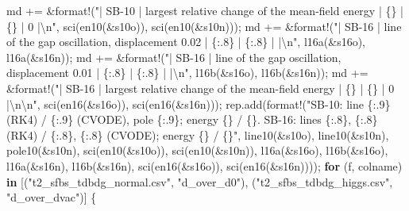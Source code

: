 \documentclass[
  10pt,
]{article}
\newenvironment{Shaded}{}{}
\newcommand{\ControlFlowTok}[1]{\textcolor[rgb]{0.00,0.44,0.13}{\textbf{#1}}}
\newcommand{\KeywordTok}[1]{\textcolor[rgb]{0.00,0.44,0.13}{\textbf{#1}}}
\newcommand{\NormalTok}[1]{#1}
\newcommand{\OperatorTok}[1]{\textcolor[rgb]{0.40,0.40,0.40}{#1}}
\newcommand{\PreprocessorTok}[1]{\textcolor[rgb]{0.74,0.48,0.00}{#1}}
\newcommand{\SpecialCharTok}[1]{\textcolor[rgb]{0.25,0.44,0.63}{#1}}
\newcommand{\StringTok}[1]{\textcolor[rgb]{0.25,0.44,0.63}{#1}}
\begin{document}
\begin{Shaded}
\begin{Highlighting}[]
\NormalTok{    md }\OperatorTok{+=} \OperatorTok{\&}\PreprocessorTok{format!}\NormalTok{(}\StringTok{"| SB{-}10 | largest relative change of the mean{-}field energy | \{\} | \{\} | 0 |}\SpecialCharTok{\textbackslash{}n}\StringTok{"}\OperatorTok{,}\NormalTok{ sci(en10(}\OperatorTok{\&}\NormalTok{s10o))}\OperatorTok{,}\NormalTok{ sci(en10(}\OperatorTok{\&}\NormalTok{s10n)))}\OperatorTok{;}
\NormalTok{    md }\OperatorTok{+=} \OperatorTok{\&}\PreprocessorTok{format!}\NormalTok{(}\StringTok{"| SB{-}16 | line of the gap oscillation, displacement 0.02 | \{:.8\} | \{:.8\} | |}\SpecialCharTok{\textbackslash{}n}\StringTok{"}\OperatorTok{,}\NormalTok{ l16a(}\OperatorTok{\&}\NormalTok{s16o)}\OperatorTok{,}\NormalTok{ l16a(}\OperatorTok{\&}\NormalTok{s16n))}\OperatorTok{;}
\NormalTok{    md }\OperatorTok{+=} \OperatorTok{\&}\PreprocessorTok{format!}\NormalTok{(}\StringTok{"| SB{-}16 | line of the gap oscillation, displacement 0.01 | \{:.8\} | \{:.8\} | |}\SpecialCharTok{\textbackslash{}n}\StringTok{"}\OperatorTok{,}\NormalTok{ l16b(}\OperatorTok{\&}\NormalTok{s16o)}\OperatorTok{,}\NormalTok{ l16b(}\OperatorTok{\&}\NormalTok{s16n))}\OperatorTok{;}
\NormalTok{    md }\OperatorTok{+=} \OperatorTok{\&}\PreprocessorTok{format!}\NormalTok{(}\StringTok{"| SB{-}16 | largest relative change of the mean{-}field energy | \{\} | \{\} | 0 |}\SpecialCharTok{\textbackslash{}n\textbackslash{}n}\StringTok{"}\OperatorTok{,}\NormalTok{ sci(en16(}\OperatorTok{\&}\NormalTok{s16o))}\OperatorTok{,}\NormalTok{ sci(en16(}\OperatorTok{\&}\NormalTok{s16n)))}\OperatorTok{;}
\NormalTok{    rep}\OperatorTok{.}\NormalTok{add(}\PreprocessorTok{format!}\NormalTok{(}\StringTok{"SB{-}10: line \{:.9\} (RK4) / \{:.9\} (CVODE), pole \{:.9\}; energy \{\} / \{\}. SB{-}16: lines \{:.8\}, \{:.8\} (RK4) / \{:.8\}, \{:.8\} (CVODE); energy \{\} / \{\}"}\OperatorTok{,}\NormalTok{ line10(}\OperatorTok{\&}\NormalTok{s10o)}\OperatorTok{,}\NormalTok{ line10(}\OperatorTok{\&}\NormalTok{s10n)}\OperatorTok{,}\NormalTok{ pole10(}\OperatorTok{\&}\NormalTok{s10n)}\OperatorTok{,}\NormalTok{ sci(en10(}\OperatorTok{\&}\NormalTok{s10o))}\OperatorTok{,}\NormalTok{ sci(en10(}\OperatorTok{\&}\NormalTok{s10n))}\OperatorTok{,}\NormalTok{ l16a(}\OperatorTok{\&}\NormalTok{s16o)}\OperatorTok{,}\NormalTok{ l16b(}\OperatorTok{\&}\NormalTok{s16o)}\OperatorTok{,}\NormalTok{ l16a(}\OperatorTok{\&}\NormalTok{s16n)}\OperatorTok{,}\NormalTok{ l16b(}\OperatorTok{\&}\NormalTok{s16n)}\OperatorTok{,}\NormalTok{ sci(en16(}\OperatorTok{\&}\NormalTok{s16o))}\OperatorTok{,}\NormalTok{ sci(en16(}\OperatorTok{\&}\NormalTok{s16n))))}\OperatorTok{;}
    \ControlFlowTok{for}\NormalTok{ (f}\OperatorTok{,}\NormalTok{ colname) }\KeywordTok{in}\NormalTok{ [(}\StringTok{"t2\_sfbs\_tdbdg\_normal.csv"}\OperatorTok{,} \StringTok{"d\_over\_d0"}\NormalTok{)}\OperatorTok{,}\NormalTok{ (}\StringTok{"t2\_sfbs\_tdbdg\_higgs.csv"}\OperatorTok{,} \StringTok{"d\_over\_dvac"}\NormalTok{)] }\OperatorTok{\{}

\end{Highlighting}
\end{Shaded}
\end{document}
